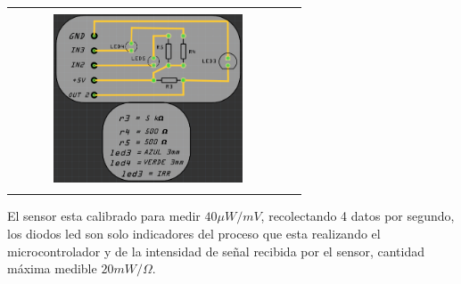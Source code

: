 \documentclass[12]{article}
\newenvironment{Figure}
{\par\medskip\noindent\minipage{\linewidth}}
{\endminipage\par\medskip}
\begin{document}
\begin{multicols}{2}
\begin{Figure}
\center
\begin{tabular}{|l|r|}
\hline
\\
\includegraphics[width=8cm, height=5cm]{img/H2.png}  \\\\ \hline
\end{tabular}
\label{fig:Elec_Pas_placa}
\end{Figure}
El sensor esta calibrado para medir $40 \mu W/mV$, recolectando 4 datos por segundo, los diodos led son solo indicadores del proceso que esta realizando el microcontrolador y de la intensidad de señal recibida por el sensor, cantidad máxima medible $20 mW/\Omega$.


\end{multicols}
\end{document}
